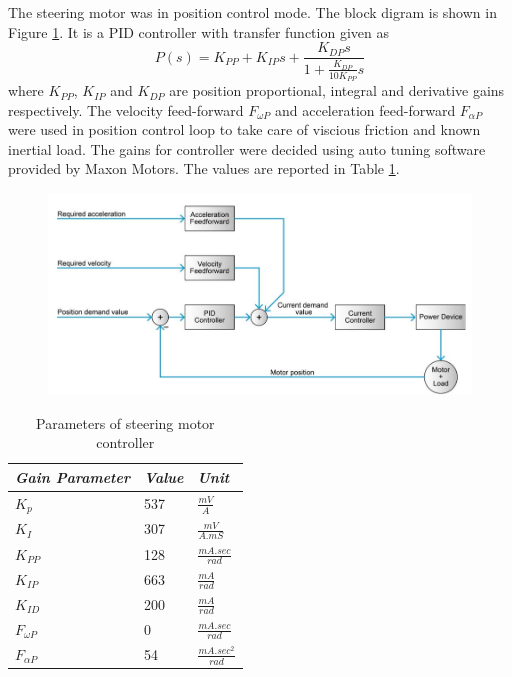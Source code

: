 The steering motor was in position control mode. The block digram is shown in Figure \ref{fig:posloop}. It is a PID controller with transfer function given as 
\begin{equation}
P(s)=K_{PP}+K_{IP}s+\frac{K_{DP}s}{1+\frac{K_{DP}}{10 K_{PP}}s}
\end{equation}
where $K_{PP}$, $K_{IP}$ and $K_{DP}$ are position proportional, integral and derivative gains respectively. The velocity feed-forward $F_{\omega P}$ and acceleration feed-forward $F_{\alpha P}$ were used in position control loop to take care of viscious friction and known inertial load. The gains for controller were decided using auto tuning software provided by Maxon Motors. The values are reported in Table \ref{tb:steer}.
\begin{figure}
	\includegraphics[width=\linewidth,keepaspectratio]{Chapter5/fig/posLoop}
	\label{fig:posloop} 
\end{figure}
\begin{table}[!htbp]
	\caption{ Parameters of steering motor controller }
	\label{tb:steer}
	\centering
	\begin{tabular}{l l l}
		\hline
		\emph{Gain Parameter}  & \emph{ Value} & \emph{Unit} \\
		\hline
		$K_p$  & 537 &  $\frac{mV}{A}$ \\ 
		$K_I $ & 307 & $\frac{mV}{A.mS}$ \\
		$K_{PP}$& 128 & $ \frac{mA.sec}{rad}$\\
		$K_{IP}$&663&$\frac{mA}{rad}$\\
		$K_{ID}$&200&$\frac{mA}{rad}$\\
		$F_{\omega P}$& 0& $ \frac{mA.sec}{rad}$\\
		$F_{\alpha P}$& 54& $ \frac{mA.sec^2}{rad}$\\
		\hline
	\end{tabular}
\end{table}
